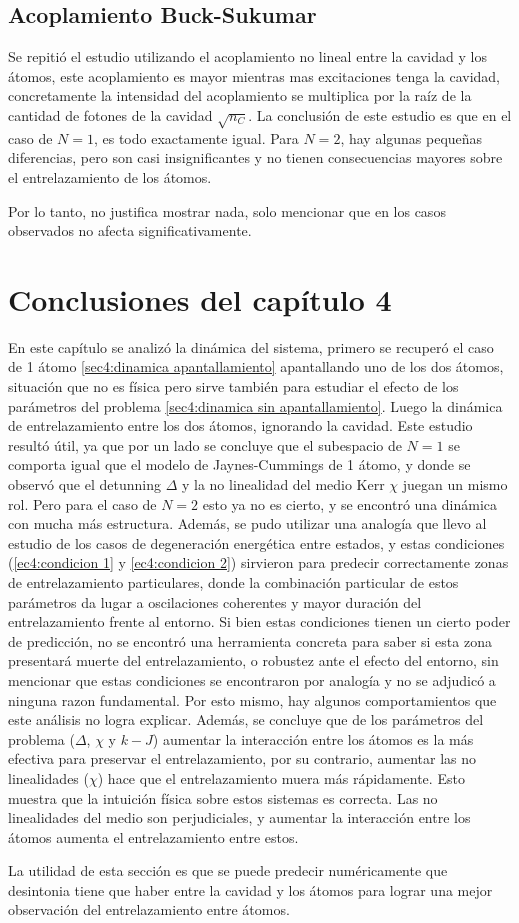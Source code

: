\subsection{Acoplamiento Buck-Sukumar}
Se repitió el estudio utilizando el acoplamiento no lineal entre la cavidad y los átomos, este acoplamiento es mayor mientras mas excitaciones tenga la cavidad, concretamente la intensidad del acoplamiento se multiplica por la raíz de la cantidad de fotones de la cavidad $\sqrt{n_C}$. 
La conclusión de este estudio es que en el caso de $N=1$, es todo exactamente igual. Para $N=2$, hay algunas pequeñas diferencias, pero son casi insignificantes y no tienen consecuencias mayores sobre el entrelazamiento de los átomos. 

Por lo tanto, no justifica mostrar nada, solo mencionar que en los casos observados no afecta significativamente.

\section{Conclusiones del capítulo 4}
En este capítulo se analizó la dinámica del sistema, primero se recuperó el caso de 1 átomo \ref{sec4:dinamica apantallamiento} apantallando uno de los dos átomos, situación que no es física pero sirve también para estudiar el efecto de los parámetros del problema \ref{sec4:dinamica sin apantallamiento}. Luego la dinámica de entrelazamiento entre los dos átomos, ignorando la cavidad. Este estudio resultó útil, ya que por un lado se concluye que el subespacio de $N=1$ se comporta igual que el modelo de Jaynes-Cummings de 1 átomo, y donde se observó que el detunning $\Delta$ y la no linealidad del medio Kerr $\chi$ juegan un mismo rol. Pero para el caso de $N=2$ esto ya no es cierto, y se encontró una dinámica con mucha más estructura. Además, se pudo utilizar una analogía que llevo al estudio de los casos de degeneración energética entre estados, y estas condiciones (\ref{ec4:condicion 1} y \ref{ec4:condicion 2}) sirvieron para predecir correctamente zonas de entrelazamiento particulares, donde la combinación particular de estos parámetros da lugar a oscilaciones coherentes y mayor duración del entrelazamiento frente al entorno. Si bien estas condiciones tienen un cierto poder de predicción, no se encontró una herramienta concreta para saber si esta zona presentará muerte del entrelazamiento, o robustez ante el efecto del entorno, sin mencionar que estas condiciones se encontraron por analogía y no se adjudicó a ninguna razon fundamental. Por esto mismo, hay algunos comportamientos que este análisis no logra explicar. Además, se concluye que de los parámetros del problema ($\Delta$, $\chi$ y $k-J$) aumentar la interacción entre los átomos es la más efectiva para preservar el entrelazamiento, por su contrario, aumentar las no linealidades ($\chi$) hace que el entrelazamiento muera más rápidamente. Esto muestra que la intuición física sobre estos sistemas es correcta. Las no linealidades del medio son perjudiciales, y aumentar la interacción entre los átomos aumenta el entrelazamiento entre estos. 

La utilidad de esta sección es que se puede predecir numéricamente que desintonia tiene que haber entre la cavidad y los átomos para lograr una mejor observación del entrelazamiento entre átomos.
